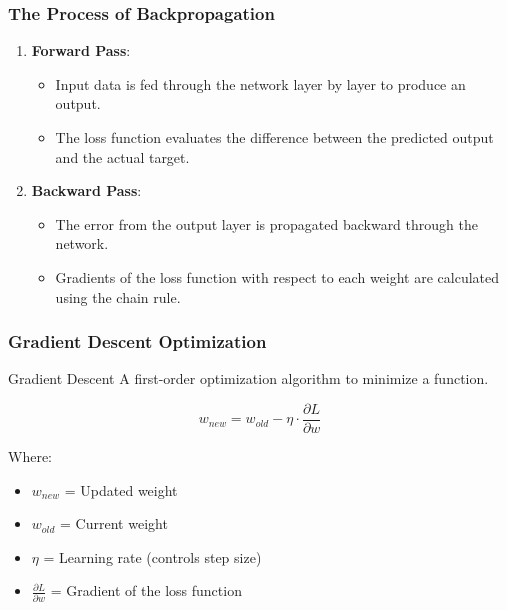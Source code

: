 \documentclass[aspectratio=169]{beamer}
\begin{document}
\begin{frame}[fragile]
  \frametitle{The Process of Backpropagation}
  \begin{enumerate}
    \item \textbf{Forward Pass}:
    \begin{itemize}
      \item Input data is fed through the network layer by layer to produce an output.
      \item The loss function evaluates the difference between the predicted output and the actual target.
    \end{itemize}
    
    \item \textbf{Backward Pass}:
    \begin{itemize}
      \item The error from the output layer is propagated backward through the network.
      \item Gradients of the loss function with respect to each weight are calculated using the chain rule.
    \end{itemize}
  \end{enumerate}
\end{frame}

\begin{frame}[fragile]
  \frametitle{Gradient Descent Optimization}
  \begin{block}{Gradient Descent}
    A first-order optimization algorithm to minimize a function.
  \end{block}

  \begin{equation}
    w_{new} = w_{old} - \eta \cdot \frac{\partial L}{\partial w}
  \end{equation}

  Where:
  \begin{itemize}
    \item \( w_{new} \) = Updated weight
    \item \( w_{old} \) = Current weight
    \item \( \eta \) = Learning rate (controls step size)
    \item \( \frac{\partial L}{\partial w} \) = Gradient of the loss function
  \end{itemize}
\end{frame}
\end{document}

